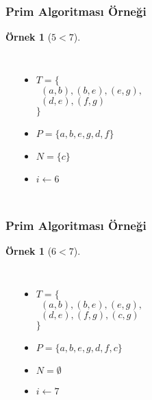\documentclass[dvipsnames]{beamer}
\theoremstyle{definition}
\theoremstyle{example}
\newtheorem{ornek}[theorem]{Örnek}
\theoremstyle{plain}
\begin{document}
\begin{frame}
  \frametitle{Prim Algoritması Örneği}

  \begin{ornek}[$5 < 7$]
    \begin{columns}
      \begin{center}
      \end{center}

      \pause
      \begin{itemize}
        \item $T = \{$\\
          $~~(a,b), (b,e), (e,g),$\\
          $~~(d,e), (f,g)$\\
          $\}$
        \item $P = \{ a, b, e, g, d, f \}$
        \item $N = \{ c \}$
        \item $i \leftarrow 6$
      \end{itemize}
    \end{columns}
  \end{ornek}
\end{frame}

\begin{frame}
  \frametitle{Prim Algoritması Örneği}

  \begin{ornek}[$6 < 7$]
    \begin{columns}
      \begin{center}
      \end{center}

      \pause
      \begin{itemize}
        \item $T = \{$\\
          $~~(a,b), (b,e), (e,g),$\\
          $~~(d,e), (f,g), (c,g)$\\
          $\}$
        \item $P = \{ a, b, e, g, d, f, c \}$
        \item $N = \emptyset$
        \item $i \leftarrow 7$
      \end{itemize}
    \end{columns}
  \end{ornek}
\end{frame}
\end{document}
